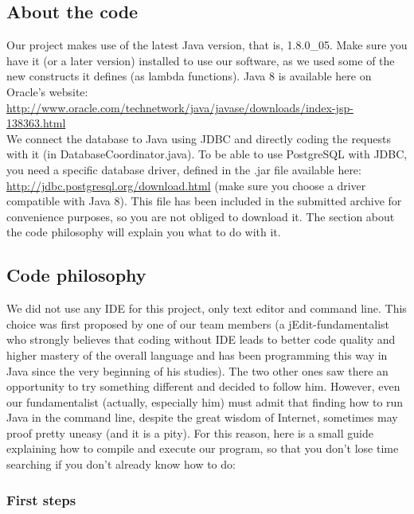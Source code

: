 \documentclass[a4paper ,12pt,french]{article}
\begin{document}
\subsection{About the code}
Our project makes use of the latest Java version, that is, 1.8.0\_05. Make sure you have it (or a later version) installed to use our software, as we used some of the new constructs it defines (as lambda functions). Java 8 is available here on Oracle’s website: 
\url{http://www.oracle.com/technetwork/java/javase/downloads/index-jsp-138363.html }\\


We connect the database to Java using JDBC and directly coding the requests with it (in DatabaseCoordinator.java). To be able to use PostgreSQL with JDBC, you need a specific database driver, defined in the .jar file available here: 
\url{http://jdbc.postgresql.org/download.html} (make sure you choose a driver compatible with Java 8). This file has been included in the submitted archive for convenience purposes, so you are not obliged to download it. The section about the code philosophy will explain you what to do with it.

\subsection{Code philosophy}

We did not use any IDE for this project, only text editor and command line. This choice was first proposed by one of our team members (a jEdit-fundamentalist who strongly believes that coding without IDE leads to better code quality and higher mastery of the overall language and has been programming this way in Java since the very beginning of his studies). The two other ones saw there an opportunity to try something different and decided to follow him. 
However, even our fundamentalist (actually, especially him) must admit that finding how to run Java in the command line, despite the great wisdom of Internet, sometimes may proof pretty uneasy (and it is a pity). For this reason, here is a small guide explaining how to compile and execute our program, so that you don’t lose time searching if you don’t already know how to do:

\subsubsection{First steps}
\end{document}

